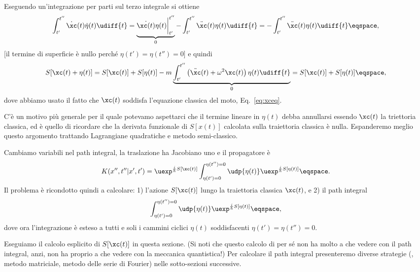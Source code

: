 Eseguendo un'integrazione per parti sul terzo integrale si ottiene
\begin{displaymath}
\int_{t'}^{t''} \dot{\xc}(t) \dot{\eta}(t)  \udiff{t} = 
\underbrace{\dot{\xc(t)} \eta(t)  \bigg|_{t'}^{t''} }_{0} - \int_{t'}^{t''} \ddot{\xc}(t) \eta(t)
\udiff{t} = -\int_{t'}^{t''} \ddot{\xc}(t) \eta(t) \udiff{t} \eqspace, 
\end{displaymath}
[il termine di superficie \`e nullo perch\'e $\eta(t') = \eta(t'') =0 $]
e quindi
\begin{displaymath}
S[\xc(t) + \eta(t)] =  S[\xc(t)] + S[\eta(t)] - m \underbrace{\int_{t'}^{t''}  \left(
\ddot{\xc}(t) + \omega^{2} \xc(t) \right) \eta(t) \udiff{t} }_{0}  = S[\xc(t)] +
S[\eta(t)] \eqspace, 
\end{displaymath}
dove abbiamo usato il fatto che $\xc(t)$ soddisfa l'equazione classica del moto,
Eq.~\eqref{eq:xceq}.
\begin{remark}
C'\`e un motivo pi\`u generale per il quale potevamo aspettarci che  il termine
lineare in $\eta(t)$ debba annullarsi essendo $\xc(t)$ la triettoria classica, ed \`e quello di
ricordare che  la
derivata funzionale di $S[x(t)]$ calcolata sulla traiettoria classica 
\`e nulla. 
Espanderemo meglio questo argomento  trattando Lagrangiane quadratiche e metodo
semi-classico.
\end{remark}
\par
Cambiamo variabili nel path integral, la traslazione ha Jacobiano uno e  il
propagatore \`e
\begin{displaymath}
K(x'', t'' | x', t') = \uexp^{ \frac{i}{\hbar} S[\xc(t)]} 
\int_{\eta(t') =
0}^{\eta(t'') = 0} \udp{\eta(t)} \uexp^{ \frac{i}{\hbar} S[\eta(t)]} \eqspace .
\end{displaymath}
Il problema \`e ricondotto quindi a calcolare:
1) l'azione $S[\xc(t)]$ lungo la traiettoria classica $\xc(t)$, 
e 2) il path integral
\begin{displaymath}
\int_{\eta(t') =
0}^{\eta(t'') = 0} \udp{\eta(t)} \uexp^{ \frac{i}{\hbar} S[\eta(t)]} \eqspace ,
\end{displaymath}
dove ora l'integrazione \`e esteso a tutti e soli i cammini ciclici $\eta(t)$
soddisfacenti $\eta(t')  = \eta(t'') = 0$.

Eseguiamo  il calcolo esplicito di $S[\xc(t)]$ in questa sezione.  (Si noti che
questo  calcolo di per s\'e non ha molto  a che vedere con il path integral,
anzi, non ha  proprio a che vedere con la meccanica quantistica!) Per calcolare
il  path integral presenteremo diverse strategie (\ie, metodo matriciale, metodo
delle serie di Fourier) nelle sotto-sezioni successive.


